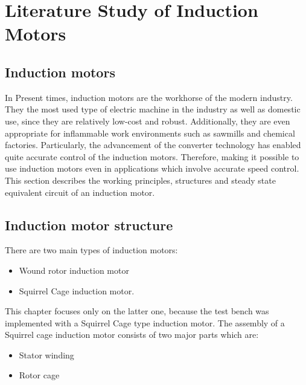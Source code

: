 
\chapter{Literature Study of Induction Motors} %
\label{Literature Study of Induction Motors}

\section{Induction motors}
In Present times, induction motors are the workhorse of the modern industry. They the most used type of electric machine in the industry as well as domestic use, since they are relatively low-cost and robust. Additionally, they are even appropriate for inflammable work environments such as sawmills and chemical factories. Particularly, the advancement of the converter technology has enabled quite accurate control of the induction motors. Therefore, making it possible to use induction motors even in applications which involve accurate speed control. This section describes the working principles, structures and steady state equivalent circuit of an induction motor.

\section{Induction motor structure}
There are two main types of induction motors: 
\begin{itemize}
	\item Wound rotor induction motor 
	\item Squirrel Cage induction motor. 
\end{itemize}

This chapter focuses only on the latter one, because the test bench was implemented with a Squirrel Cage type induction motor. The assembly of a Squirrel cage induction motor consists of two major parts which are:
\begin{itemize}
	\item Stator winding 
	\item Rotor cage
\end{itemize}

